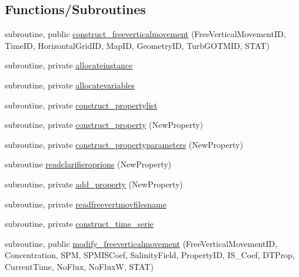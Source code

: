 \subsection*{Functions/\+Subroutines}
\begin{DoxyCompactItemize}
\item 
subroutine, public \mbox{\hyperlink{namespacemodulefreeverticalmovement_a3b98553e1845617e703a449e92c798c9}{construct\+\_\+freeverticalmovement}} (Free\+Vertical\+Movement\+ID, Time\+ID, Horizontal\+Grid\+ID, Map\+ID, Geometry\+ID, Turb\+G\+O\+T\+M\+ID, S\+T\+AT)
\item 
subroutine, private \mbox{\hyperlink{namespacemodulefreeverticalmovement_a07f25d7228ee74ef7003eea9ba19e494}{allocateinstance}}
\item 
subroutine, private \mbox{\hyperlink{namespacemodulefreeverticalmovement_a7ec18a4b674d7b9ea1339f2a93116e0a}{allocatevariables}}
\item 
subroutine, private \mbox{\hyperlink{namespacemodulefreeverticalmovement_a5ca7e73e0a11ea273e8a65cdd0734e44}{construct\+\_\+propertylist}}
\item 
subroutine, private \mbox{\hyperlink{namespacemodulefreeverticalmovement_af393a68b806664c9eea39ca1dec93cf9}{construct\+\_\+property}} (New\+Property)
\item 
subroutine, private \mbox{\hyperlink{namespacemodulefreeverticalmovement_a5899cd9d999076fff990bfecf3b374a7}{construct\+\_\+propertyparameters}} (New\+Property)
\item 
subroutine \mbox{\hyperlink{namespacemodulefreeverticalmovement_a2b10bad3ef2fbac72aed08e6bf29bcd6}{readclarifieroprions}} (New\+Property)
\item 
subroutine, private \mbox{\hyperlink{namespacemodulefreeverticalmovement_a9138567f31f0c9e91b69d5268c3855ce}{add\+\_\+property}} (New\+Property)
\item 
subroutine, private \mbox{\hyperlink{namespacemodulefreeverticalmovement_adb8368e5dfca81f3d1a6bd7881e19c7f}{readfreevertmovfilesname}}
\item 
subroutine, private \mbox{\hyperlink{namespacemodulefreeverticalmovement_a2ca295c9f72cbcb4ce9b0d893235eca0}{construct\+\_\+time\+\_\+serie}}
\item 
subroutine, public \mbox{\hyperlink{namespacemodulefreeverticalmovement_a70493770ba7c42e3f3d4dc5f09ae0e45}{modify\+\_\+freeverticalmovement}} (Free\+Vertical\+Movement\+ID, Concentration, S\+PM, S\+P\+M\+I\+S\+Coef, Salinity\+Field, Property\+ID, I\+S\+\_\+\+Coef, D\+T\+Prop, Current\+Time, No\+Flux, No\+FluxW, S\+T\+AT)

\end{DoxyCompactItemize}
